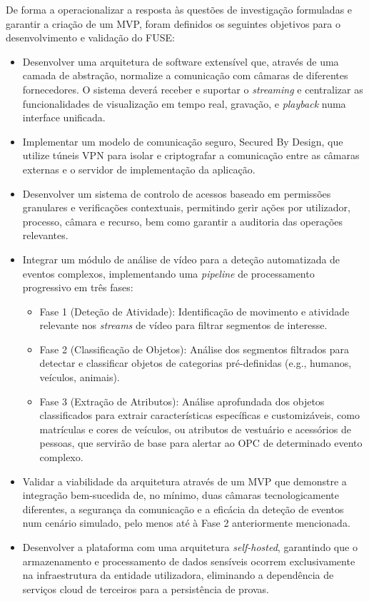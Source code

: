 De forma a operacionalizar a resposta às questões de investigação formuladas e garantir a criação de um \gls{MVP}, foram definidos os seguintes objetivos para o desenvolvimento e validação do \gls{FUSE}:

\begin{itemize}
    \item Desenvolver uma arquitetura de software extensível que, através de uma camada de abstração, normalize a comunicação com câmaras de diferentes fornecedores. O sistema deverá receber e suportar o \textit{streaming} e centralizar as funcionalidades de visualização em tempo real, gravação, e \textit{playback} numa interface unificada.
    \item Implementar um modelo de comunicação seguro, Secured By Design, que utilize túneis \gls{VPN} para isolar e criptografar a comunicação entre as câmaras externas e o servidor de implementação da aplicação.
    \item Desenvolver um sistema de controlo de acessos baseado em permissões granulares e verificações contextuais, permitindo gerir ações por utilizador, processo, câmara e recurso, bem como garantir a auditoria das operações relevantes.
    \item Integrar um módulo de análise de vídeo para a deteção automatizada de eventos complexos, implementando uma \textit{pipeline} de processamento progressivo em três fases:
    \begin{itemize}
        \item Fase 1 (Deteção de Atividade): Identificação de movimento e atividade relevante nos \textit{streams} de vídeo para filtrar segmentos de interesse.
        \item Fase 2 (Classificação de Objetos): Análise dos segmentos filtrados para detectar e classificar objetos de categorias pré-definidas (e.g., humanos, veículos, animais).
        \item Fase 3 (Extração de Atributos): Análise aprofundada dos objetos classificados para extrair características específicas e customizáveis, como matrículas e cores de veículos, ou atributos de vestuário e acessórios de pessoas, que servirão de base para alertar ao \gls{OPC} de determinado evento complexo.
    \end{itemize}
    \item Validar a viabilidade da arquitetura através de um \gls{MVP} que demonstre a integração bem-sucedida de, no mínimo, duas câmaras tecnologicamente diferentes, a segurança da comunicação e a eficácia da deteção de eventos num cenário simulado, pelo menos até à Fase 2 anteriormente mencionada.
    \item Desenvolver a plataforma com uma arquitetura \textit{self-hosted}, garantindo que o armazenamento e processamento de dados sensíveis ocorrem exclusivamente na infraestrutura da entidade utilizadora, eliminando a dependência de serviços cloud de terceiros para a persistência de provas.
\end{itemize}

